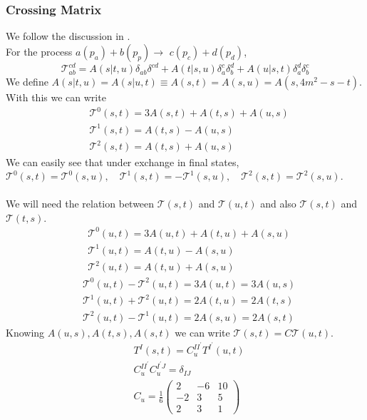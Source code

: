 ﻿\documentclass[12pt,a4paper]{article}
\begin{document}
\subsubsection{Crossing Matrix}
We follow the discussion in \cite{6}.\\
For the process $a\left(p_{a}\right)+b\left(p_{p}\right) \rightarrow$ $c\left(p_{c}\right)+d\left(p_{d}\right)$,
$$
\mathcal{T}_{a b}^{c d}=A(s|t, u) \delta_{a b} \delta^{c d}+A(t|s, u) \delta_{a}^{c} \delta_{b}^{d}+A(u|s, t) \delta_{a}^{d} \delta_{b}^{c}
$$
We define $A(s|t, u)=A(s|u,t)\equiv A(s,t)=A(s,u)=A(s,4m^{2}-s-t)$. With this we can write
$$
\begin{aligned}
&\mathcal{T}^{0}(s, t)=3 A(s, t)+A(t, s)+A(u, s) \\
&\mathcal{T}^{1}(s, t)=A(t, s)-A(u, s) \\
&\mathcal{T}^{2}(s, t)=A(t, s)+A(u, s)
\end{aligned}
$$
We can easily see that under exchange in final states, $\mathcal{T}^{0}(s, t)=\mathcal{T}^{0}(s, u), \quad \mathcal{T}^{1}(s, t)=-\mathcal{T}^{1}(s, u), \quad \mathcal{T}^{2}(s, t)=\mathcal{T}^{2}(s, u)$.\\\\
We will need the relation between $\mathcal{T}(s, t)$ and $\mathcal{T}(u,t)$ and also $\mathcal{T}(s, t)$ and $\mathcal{T}(t,s)$.
$$
\begin{aligned}
&\mathcal{T}^{0}(u, t)=3 A(u, t)+A(t, u)+A(s,u) \\
&\mathcal{T}^{1}(u, t)=A(t, u)-A(s,u) \\
&\mathcal{T}^{2}(u, t)=A(t, u)+A(s,u)
\end{aligned}
$$
$$
\begin{aligned}
&\mathcal{T}^{0}(u, t)-\mathcal{T}^{2}(u, t)=3 A(u, t)=3 A(u, s) \\
&\mathcal{T}^{1}(u, t)+\mathcal{T}^{2}(u, t)=2A(t, u)=2A(t, s)\\
&\mathcal{T}^{2}(u, t)-\mathcal{T}^{1}(u, t)=2A(s,u)=2A(s,t)
\end{aligned}
$$
Knowing $A(u, s), A(t, s), A(s, t)$ we can write $\mathcal{T}(s, t)=C \mathcal{T}(u, t)$.
$$
\begin{aligned}
&T^{I}(s, t) =C_{u}^{I I^{\prime}} T^{I^{\prime}}(u, t) \\
&C_{u}^{I I^{\prime}} C_{u}^{I^{\prime} J} =\delta_{I J} \\
&C_{u} =\frac{1}{6}\left(\begin{array}{rrr}
2 & -6 & 10 \\
-2 & 3 & 5 \\
2 & 3 & 1
\end{array}\right)
\end{aligned}
$$
\end{document}

